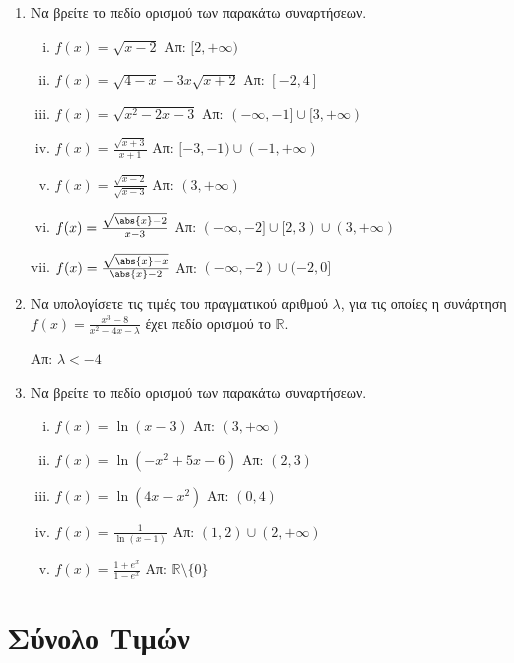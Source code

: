 \begin{enumerate}
  \item  Να βρείτε το πεδίο ορισμού των παρακάτω συναρτήσεων.
    \begin{enumerate}[i)]
      \item $ f(x) = \sqrt{x-2} $ \hfill Απ: $[2,+\infty)$
      \item $ f(x) = \sqrt{4-x} -3x \sqrt{x+2} $ \hfill Απ: $ [-2,4] $ 
      \item $ f(x) = \sqrt{x^{2}-2x-3} $ \hfill Απ: $ (-\infty,-1] 
        \cup [3,+\infty) $  
      \item $ f(x) = \frac{\sqrt{x+3}}{x+1} $ \hfill Απ: 
        $ [-3,-1) \cup (-1,+\infty)  $ 
      \item $ f(x) = \frac{\sqrt{x-2}}{\sqrt{x-3}} $ \hfill Απ:
        $ ( 3, +\infty ) $  
      \item $ f(x) = \frac{\sqrt{\abs{x}-2}}{x-3} $ \hfill 
        Απ: $ ( -\infty, -2 ] \cup [2,3) \cup (3,+\infty) $ 
      \item $ f(x) = \frac{\sqrt{\abs{x}-x}}{\abs{x}-2} $ \hfill Απ: 
        $ (-\infty,-2) \cup (-2,0] $
    \end{enumerate}

  \item Να υπολογίσετε τις τιμές του πραγματικού αριθμού $ \lambda $, για τις 
    οποίες η συνάρτηση $ f(x) = \frac{x^{3}-8}{x^{2}-4x- \lambda} $ έχει πεδίο 
    ορισμού το $ \mathbb{R} $.

    \hfill Απ: $ \lambda < -4 $ 

  \item  Να βρείτε το πεδίο ορισμού των παρακάτω συναρτήσεων.
    \begin{enumerate}[i)]
      \item $ f(x) = \ln{(x-3)} $ \hfill Απ: $(3,+\infty)$
      \item $ f(x) = \ln{(-x^{2}+5x-6)} $ \hfill Απ: $ (2,3) $
      \item $ f(x) = \ln{(4x-x^{2})} $ \hfill Απ: $ (0,4) $
      \item $ f(x) = \frac{1}{\ln{(x-1)}} $ \hfill Απ: $ (1,2) \cup (2,+\infty) $ 
      \item $ f(x) = \frac{1+e^{x}}{1-e^{x}} $ \hfill Απ: 
        $ \mathbb{R} \setminus \{ 0 \} $ 
    \end{enumerate}
\end{enumerate}


\section*{Σύνολο Τιμών}


